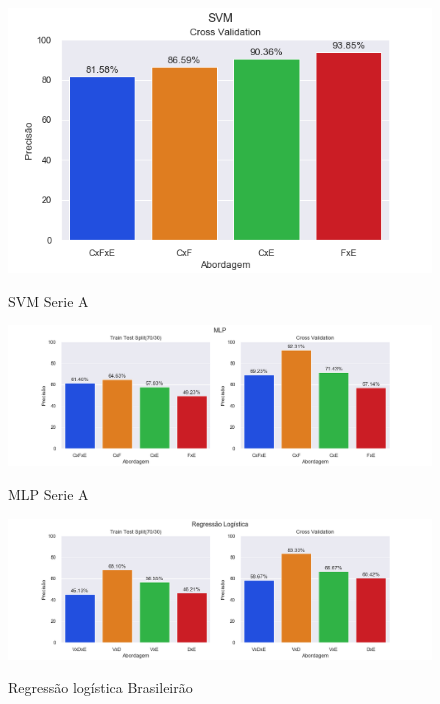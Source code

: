 \begin{figure}[htbp]
  \begin{center}
  \includegraphics[width=0.7\linewidth]{imagens/resultados/svm_sa.png}\\
  \end{center}
  \caption[SVM Serie A]{SVM Serie A}
  \label{fig:logo}
\end{figure}

\begin{figure}[htbp]
  \begin{center}
  \includegraphics[width=1.05\linewidth]{imagens/resultados/mlp_sa.png}\\
  \end{center}
  \caption[MLP Serie A]{MLP Serie A}
  \label{fig:logo}
\end{figure}
	
\begin{figure}[htbp]
  \begin{center}
  \includegraphics[width=1.05\linewidth]{imagens/resultados/regressao_logistica_br.png}\\
  \end{center}
  \caption[Regressão logística Brasileirão]{Regressão logística Brasileirão}
  \label{fig:logo}
\end{figure}

